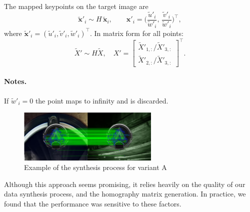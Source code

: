 The mapped keypoints on the target image are
\[
    \tilde{\mathbf{x}}'_i \sim H\,\tilde{\mathbf{x}}_i,
    \qquad
    \mathbf{x}'_i=\Big(\frac{\tilde{u}'_i}{\tilde{w}'_i},\,
    \frac{\tilde{v}'_i}{\tilde{w}'_i}\Big)^\top,
\]
where $\tilde{\mathbf{x}}'_i=(\tilde{u}'_i,\tilde{v}'_i,\tilde{w}'_i)^\top$. In
matrix form for all points:
\[
    \tilde{X}' \sim H \tilde{X}, \quad
    X'=\begin{bmatrix}
        \tilde{X}'_{1,:}/\tilde{X}'_{3,:} \\[2pt]
        \tilde{X}'_{2,:}/\tilde{X}'_{3,:}
    \end{bmatrix}^{\!\top}.
\]

\paragraph{Notes.}
If $\tilde{w}'_i=0$ the point maps to infinity and is discarded.

\begin{figure}[H]
    \centering
    \includegraphics[width=0.6\textwidth]{ressources/image2.png}
    \caption{Example of the synthesis process for variant A}
    \label{fig:variant_a}
\end{figure}

Although this approach seems promising, it relies heavily on the quality of our
data synthesis process, and the homography matrix generation. In practice, we
found that the performance was sensitive to these factors.
